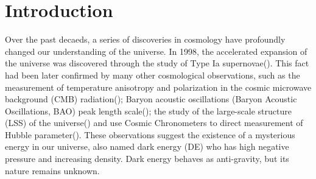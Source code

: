 \documentclass[preprint]{aastex631}
\begin{document}

\section{Introduction} \label{sec:intro}
Over the past decaeds, a series of discoveries in cosmology have profoundly changed our understanding of the universe. In 1998, the accelerated expansion of the universe was discovered through the study of Type Ia supernovae(\cite{perlmutter_discovery_1998,Riess_1998}). This fact had been later confirmed by many other cosmological observations, such as the measurement of temperature anisotropy and polarization in the cosmic microwave background (CMB) radiation(\cite{1992ApJ...396L...1S,2020Planck}); Baryon acoustic oscillations (Baryon Acoustic Oscillations, BAO) peak length scale(\cite{Eisenstein_2005,10.1111/j.1365-2966.2011.19592.x}); the study of the large-scale structure (LSS) of the universe(\cite{Dodelson_2002,Percival_2007}) and use Cosmic Chronometers to direct measurement of Hubble parameter(\cite{Daniel_Stern_2010,Moresco_2015}). These observations suggest the existence of a mysterious energy in our universe, also named dark energy (DE)  who has high negative pressure and increasing density. Dark energy behaves as anti-gravity, but its nature remains unknown.
\end{document}
